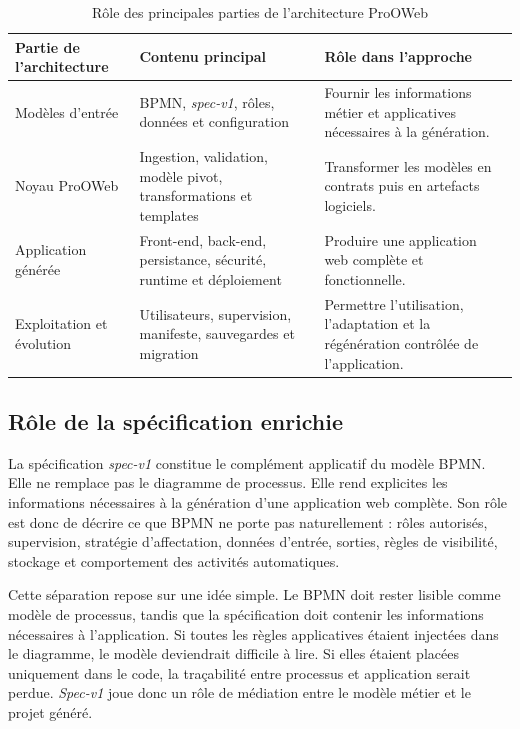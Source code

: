 \begin{table}[H]
\centering
\small
\caption{Rôle des principales parties de l'architecture ProOWeb}
\label{tab:chap3-parties-architecture}
\begin{tabular}{p{3.5cm}p{4.8cm}p{5.4cm}}
\hline
\textbf{Partie de l'architecture} & \textbf{Contenu principal} & \textbf{Rôle dans l'approche} \\
\hline
Modèles d'entrée & BPMN, \textit{spec-v1}, rôles, données et configuration & Fournir les informations métier et applicatives nécessaires à la génération. \\
Noyau ProOWeb & Ingestion, validation, modèle pivot, transformations et templates & Transformer les modèles en contrats puis en artefacts logiciels. \\
Application générée & Front-end, back-end, persistance, sécurité, runtime et déploiement & Produire une application web complète et fonctionnelle. \\
Exploitation et évolution & Utilisateurs, supervision, manifeste, sauvegardes et migration & Permettre l'utilisation, l'adaptation et la régénération contrôlée de l'application. \\
\hline
\end{tabular}
\end{table}
\label{sec:chap3-spec}

\subsection{Rôle de la spécification enrichie}

La spécification \textit{spec-v1} constitue le complément applicatif du modèle BPMN. Elle ne remplace pas le diagramme de processus. Elle rend explicites les informations nécessaires à la génération d'une application web complète. Son rôle est donc de décrire ce que BPMN ne porte pas naturellement : rôles autorisés, supervision, stratégie d'affectation, données d'entrée, sorties, règles de visibilité, stockage et comportement des activités automatiques.

Cette séparation repose sur une idée simple. Le BPMN doit rester lisible comme modèle de processus, tandis que la spécification doit contenir les informations nécessaires à l'application. Si toutes les règles applicatives étaient injectées dans le diagramme, le modèle deviendrait difficile à lire. Si elles étaient placées uniquement dans le code, la traçabilité entre processus et application serait perdue. \textit{Spec-v1} joue donc un rôle de médiation entre le modèle métier et le projet généré.


